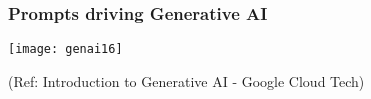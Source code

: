 
  
  




\begin{frame}[fragile]\frametitle{Prompts driving Generative AI}

\begin{center}
\texttt{[image: genai16]}
\end{center}


{\tiny (Ref: Introduction to Generative AI - Google Cloud Tech)}

\end{frame}





